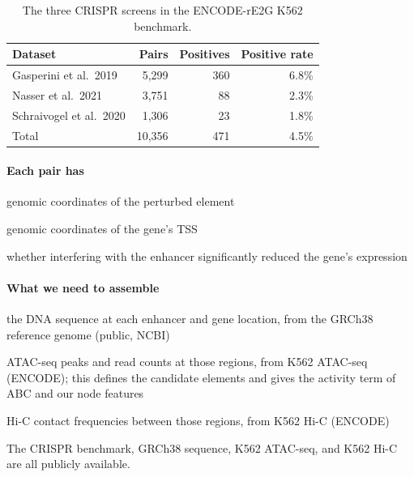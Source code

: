 \begin{table}[h]
  \caption{The three CRISPR screens in the ENCODE-rE2G K562 benchmark.}
  \label{tab:data}
  \centering
  \begin{tabular}{lrrr}
    \toprule
    Dataset & Pairs & Positives & Positive rate \\
    \midrule
    Gasperini et al.\ 2019 \cite{gasperini2019}     & 5,299  & 360 & 6.8\% \\
    Nasser et al.\ 2021 \cite{nasser2021}           & 3,751  & 88  & 2.3\% \\
    Schraivogel et al.\ 2020 \cite{schraivogel2020} & 1,306  & 23  & 1.8\% \\
    \midrule
    Total                                           & 10,356 & 471 & 4.5\% \\
    \bottomrule
  \end{tabular}
\end{table}

\paragraph{Each pair has}
\begin{description}[nosep]
  \item[Enhancer location] genomic coordinates of the perturbed element
  \item[Gene location] genomic coordinates of the gene's TSS
  \item[Binary label] whether interfering with the enhancer significantly reduced the gene's expression
\end{description}

\paragraph{What we need to assemble}
\begin{description}[nosep]
  \item[Sequence] the DNA sequence at each enhancer and gene location, from the GRCh38 reference genome (public, NCBI)
  \item[Accessibility] ATAC-seq peaks and read counts at those regions, from K562 ATAC-seq (ENCODE); this defines the candidate elements and gives the activity term of ABC and our node features
  \item[Contacts] Hi-C contact frequencies between those regions, from K562 Hi-C (ENCODE)
\end{description}

The CRISPR benchmark, GRCh38 sequence, K562 ATAC-seq, and K562 Hi-C are all publicly available. 

